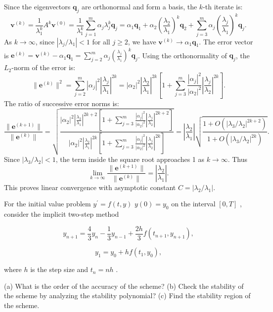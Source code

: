 \begin{solution}
Since the eigenvectors $\mathbf{q}_j$ are orthonormal and form a basis, the $k$-th iterate is:
\[
\mathbf{v}^{(k)} = \frac{1}{\lambda_1^k} A^k \mathbf{v}^{(0)} = \frac{1}{\lambda_1^k} \sum_{j=1}^m \alpha_j \lambda_j^k \mathbf{q}_j = \alpha_1 \mathbf{q}_1 + \alpha_2 \left( \frac{\lambda_2}{\lambda_1} \right)^k \mathbf{q}_2 + \sum_{j=3}^m \alpha_j \left( \frac{\lambda_j}{\lambda_1} \right)^k \mathbf{q}_j.
\]
As $k \to \infty$, since $|\lambda_j / \lambda_1| < 1$ for all $j \geq 2$, we have $\mathbf{v}^{(k)} \to \alpha_1 \mathbf{q}_1$.
The error vector is $\mathbf{e}^{(k)} = \mathbf{v}^{(k)} - \alpha_1 \mathbf{q}_1 = \sum_{j=2}^m \alpha_j \left( \frac{\lambda_j}{\lambda_1} \right)^k \mathbf{q}_j$.
Using the orthonormality of $\mathbf{q}_j$, the $L_2$-norm of the error is:
\[
\|\mathbf{e}^{(k)}\|^2 = \sum_{j=2}^m |\alpha_j|^2 \left| \frac{\lambda_j}{\lambda_1} \right|^{2k} = |\alpha_2|^2 \left| \frac{\lambda_2}{\lambda_1} \right|^{2k} \left[ 1 + \sum_{j=3}^m \frac{|\alpha_j|^2}{|\alpha_2|^2} \left| \frac{\lambda_j}{\lambda_2} \right|^{2k} \right].
\]
The ratio of successive error norms is:
\[
\frac{\|\mathbf{e}^{(k+1)}\|}{\|\mathbf{e}^{(k)}\|} = \sqrt{ \frac{ |\alpha_2|^2 \left| \frac{\lambda_2}{\lambda_1} \right|^{2k+2} \left[ 1 + \sum_{j=3}^m \frac{|\alpha_j|^2}{|\alpha_2|^2} \left| \frac{\lambda_j}{\lambda_2} \right|^{2k+2} \right] }{ |\alpha_2|^2 \left| \frac{\lambda_2}{\lambda_1} \right|^{2k} \left[ 1 + \sum_{j=3}^m \frac{|\alpha_j|^2}{|\alpha_2|^2} \left| \frac{\lambda_j}{\lambda_2} \right|^{2k} \right] } } = \left| \frac{\lambda_2}{\lambda_1} \right| \sqrt{ \frac{1 + O(|\lambda_3/\lambda_2|^{2k+2})}{1 + O(|\lambda_3/\lambda_2|^{2k})} }.
\]
Since $|\lambda_3 / \lambda_2| < 1$, the term inside the square root approaches 1 as $k \to \infty$. Thus
\[
\lim_{k \to \infty} \frac{\|\mathbf{e}^{(k+1)}\|}{\|\mathbf{e}^{(k)}\|} = \left| \frac{\lambda_2}{\lambda_1} \right|.
\]
This proves linear convergence with asymptotic constant $C = |\lambda_2 / \lambda_1|$.
\end{solution}

\begin{exercise}
\label{applied:2020:4}
For the initial value problem $y ^ { \prime } = f ( t , y )$ $y ( 0 ) = y _ { 0 }$ on the interval $[ 0 , T ]$ , consider the implicit two-step method

\[
y _ {n + 1} = \frac {4}{3} y _ {n} - \frac {1}{3} y _ {n - 1} + \frac {2 h}{3} f \left(t _ {n + 1}, y _ {n + 1}\right),
\]

\[
y _ {1} = y _ {0} + h f \left(t _ {1}, y _ {0}\right),
\]

where $h$ is the step size and $t _ { n } = n h$ .

(a) What is the order of the accuracy of the scheme?   
(b) Check the stability of the scheme by analyzing the stability polynomial?   
(c) Find the stability region of the scheme.
\end{exercise}

